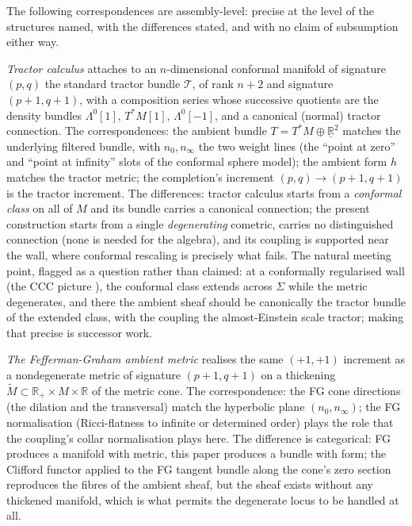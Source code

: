 \documentclass[11pt]{article}
\theoremstyle{definition}
\newcommand{\R}{\mathbb{R}}
\newcommand{\Sig}{\Sigma}
\newcommand{\nO}{n_0}
\newcommand{\nInf}{n_\infty}
\begin{document}
The following correspondences are assembly-level: precise at the level of the structures named, with the differences stated, and with no claim of subsumption either way.

\emph{Tractor calculus} \cite{BEG1994, CurryGover2018} attaches to an $n$-dimensional conformal manifold of signature $(p,q)$ the standard tractor bundle $\mathcal{T}$, of rank $n + 2$ and signature $(p{+}1, q{+}1)$, with a composition series whose successive quotients are the density bundles $\Lambda^0[1]$, $T^*M[1]$, $\Lambda^0[-1]$, and a canonical (normal) tractor connection. The correspondences: the ambient bundle $T = T^*M \oplus \underline{\R}^2$ matches the underlying filtered bundle, with $\nO, \nInf$ the two weight lines (the ``point at zero'' and ``point at infinity'' slots of the conformal sphere model); the ambient form $h$ matches the tractor metric; the completion's increment $(p,q) \to (p{+}1,q{+}1)$ is the tractor increment. The differences: tractor calculus starts from a \emph{conformal class} on all of $M$ and its bundle carries a canonical connection; the present construction starts from a single \emph{degenerating} cometric, carries no distinguished connection (none is needed for the algebra), and its coupling is supported near the wall, where conformal rescaling is precisely what fails. The natural meeting point, flagged as a question rather than claimed: at a conformally regularised wall (the CCC picture \cite{Penrose2010}), the conformal class extends across $\Sig$ while the metric degenerates, and there the ambient sheaf should be canonically the tractor bundle of the extended class, with the coupling the almost-Einstein scale tractor; making that precise is successor work.

\emph{The Fefferman-Graham ambient metric} \cite{FG1985, FG2012} realises the same $(+1,+1)$ increment as a nondegenerate metric of signature $(p{+}1,q{+}1)$ on a thickening $\widetilde{M} \subset \R_+ \times M \times \R$ of the metric cone. The correspondence: the FG cone directions (the dilation and the transversal) match the hyperbolic plane $(\nO, \nInf)$; the FG normalisation (Ricci-flatness to infinite or determined order) plays the role that the coupling's collar normalisation plays here. The difference is categorical: FG produces a manifold with metric, this paper produces a bundle with form; the Clifford functor applied to the FG tangent bundle along the cone's zero section reproduces the fibres of the ambient sheaf, but the sheaf exists without any thickened manifold, which is what permits the degenerate locus to be handled at all.
\end{document}
